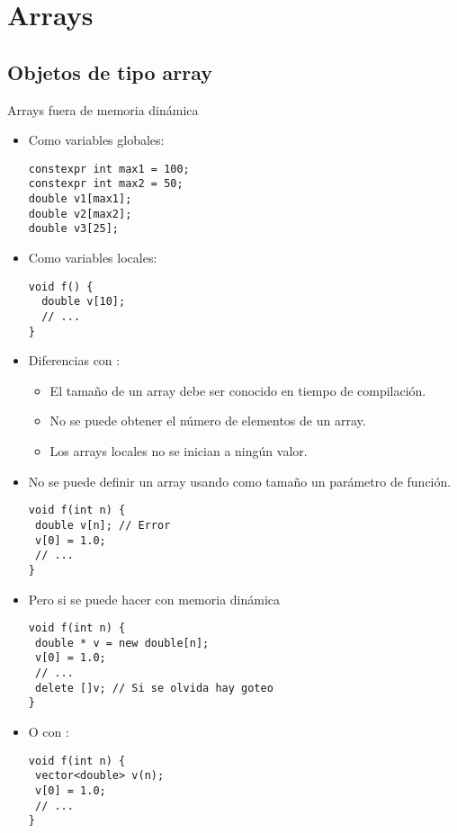 \section{Arrays}

\subsection{Objetos de tipo array}

\begin{frame}[fragile]{Arrays fuera de memoria dinámica}
\begin{itemize}
  \item Como variables globales:
\begin{lstlisting}
constexpr int max1 = 100;
constexpr int max2 = 50;
double v1[max1];
double v2[max2];
double v3[25];
\end{lstlisting}
  \item Como variables locales:
\begin{lstlisting}
void f() {
  double v[10];
  // ...
}
\end{lstlisting}
  \item Diferencias con :
    \begin{itemize}
      \item El tamaño de un array debe ser conocido en tiempo de compilación.
      \item No se puede obtener el número de elementos de un array.
      \item Los arrays locales no se inician a ningún valor.
    \end{itemize}
\end{itemize}
\end{frame}

\begin{frame}[fragile]
\vspace{-0.5em}
\begin{itemize}
  \item No se puede definir un array usando como tamaño un parámetro de función.
\begin{lstlisting}
void f(int n) {
 double v[n]; // Error
 v[0] = 1.0;
 // ...
}
\end{lstlisting}
  \item Pero si se puede hacer con memoria dinámica
\begin{lstlisting}
void f(int n) {
 double * v = new double[n];
 v[0] = 1.0;
 // ...
 delete []v; // Si se olvida hay goteo
}
\end{lstlisting}
  \item O con :
\begin{lstlisting}
void f(int n) {
 vector<double> v(n);
 v[0] = 1.0;
 // ...
}
\end{lstlisting}
\end{itemize}
\end{frame}

